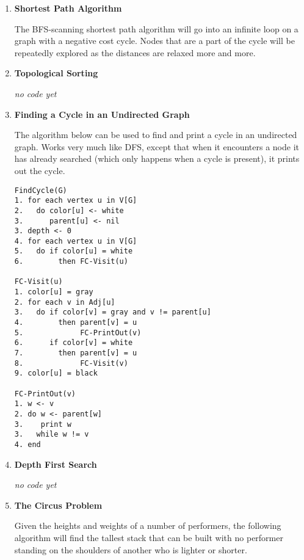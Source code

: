 \documentclass{article}
\begin{document}
\begin{enumerate}
\begin{enumerate}
\item The shortest path tree using Dijkstra's algorithm, and the
breadth first search tree for the graph on page 499 of the text
are shown in figure \ref{2-2c}.

\begin{figure}[htbp]
  \centerline{}
  \caption{shortest path and search trees}
  \label{2-2c}
\end{figure}
\end{enumerate}

\item {\bf Shortest Path Algorithm}

The BFS-scanning shortest path algorithm will go into an infinite
loop on a graph with a negative cost cycle. Nodes that are a part
of the cycle will be repeatedly explored as the distances are
relaxed more and more.

\item{\bf Topological Sorting}

{\it no code yet}

\item {\bf Finding a Cycle in an Undirected Graph}

The algorithm below can be used to find and print a cycle in an
undirected graph. Works very much like DFS, except that when it
encounters a node it has already searched (which only happens when
a cycle is present), it prints out the cycle.

\begin{verbatim}
FindCycle(G)
1. for each vertex u in V[G]
2.   do color[u] <- white
3.      parent[u] <- nil
3. depth <- 0
4. for each vertex u in V[G]
5.   do if color[u] = white
6.        then FC-Visit(u)

FC-Visit(u)
1. color[u] = gray
2. for each v in Adj[u]
3.   do if color[v] = gray and v != parent[u]
4.        then parent[v] = u
5.             FC-PrintOut(v)
6.      if color[v] = white
7.        then parent[v] = u
8.             FC-Visit(v)
9. color[u] = black

FC-PrintOut(v)
1. w <- v
2. do w <- parent[w]
3.    print w
3.   while w != v
4. end
\end{verbatim}

\item {\bf Depth First Search}

{\it no code yet}

\item {\bf The Circus Problem}

Given the heights and weights of a number of performers, the
following algorithm will find the tallest stack that can be built
with no performer standing on the shoulders of another who is
lighter or shorter.


\end{enumerate}
\end{document}
